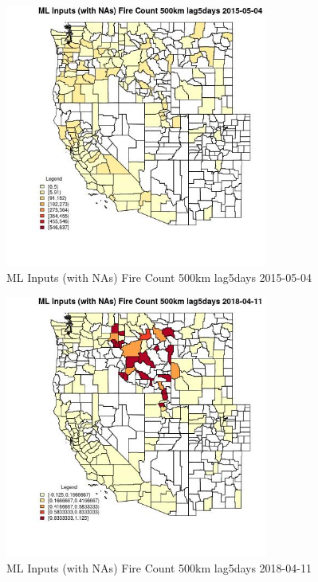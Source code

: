 \begin{figure} 
\centering  
\includegraphics[width=0.77\textwidth]{Code_Outputs/Report_ML_input_PM25_Step4_part_e_de_duplicated_aves_compiled_2019-05-18wNAs_CountyFire_Count_500km_lag5daysMean2015-05-04.jpg} 
\caption{\label{fig:Report_ML_input_PM25_Step4_part_e_de_duplicated_aves_compiled_2019-05-18wNAsCountyFire_Count_500km_lag5daysMean2015-05-04}ML Inputs (with NAs) Fire Count 500km lag5days 2015-05-04} 
\end{figure} 
 

\begin{figure} 
\centering  
\includegraphics[width=0.77\textwidth]{Code_Outputs/Report_ML_input_PM25_Step4_part_e_de_duplicated_aves_compiled_2019-05-18wNAs_CountyFire_Count_500km_lag5daysMean2018-04-11.jpg} 
\caption{\label{fig:Report_ML_input_PM25_Step4_part_e_de_duplicated_aves_compiled_2019-05-18wNAsCountyFire_Count_500km_lag5daysMean2018-04-11}ML Inputs (with NAs) Fire Count 500km lag5days 2018-04-11} 
\end{figure} 
 

